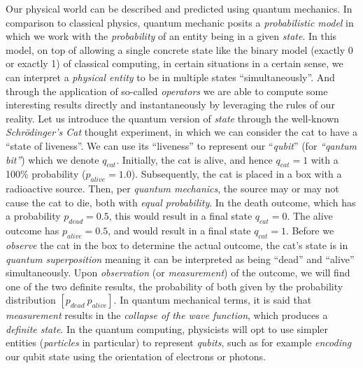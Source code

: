 \documentclass[conference]{IEEEtran}
\begin{document}
Our physical world can be described and predicted using quantum mechanics.
In comparison to classical physics, quantum mechanic posits a \textit{probabilistic model} in which we work with the \textit{probability} of an entity being in a given
\textit{state}.
In this model, on top of allowing a single concrete state like the binary model (exactly 0 or exactly 1) of classical computing,
in certain situations in a certain sense, we can interpret a \textit{physical entity}
to be in multiple states ``simultaneously''.
And through the application of so-called \textit{operators}
we are able to compute some interesting results directly and instantaneously by leveraging the rules of our reality.
Let us introduce the quantum version of \textit{state} through the well-known \textit{Schrödinger's Cat} thought experiment,
in which we can consider the cat to have a ``state of liveness''.
We can use its ``liveness'' to represent our ``\textit{qubit}'' (for \textit{``qantum bit''}) which we denote $q_{cat}$.
Initially, the cat is alive, and hence $q_{cat} = 1$ with
a 100\% probability ($p_{alive} = 1.0$).
Subsequently, the cat is placed in a box with a radioactive source. Then, per \textit{quantum mechanics},
the source may or may not cause the cat to die, both with \textit{equal probability}.
In the death outcome, which has a probability $p_{dead} = 0.5$, this would result in a final state $q_{cat} = 0$.
The alive outcome has $p_{alive} = 0.5$, and would result in a final state $q_{cat} = 1$.
Before we \textit{observe} the cat in the box to determine the actual outcome,
the cat's state is in \textit{quantum superposition} meaning it can be interpreted as being ``dead'' and ``alive'' simultaneously.
Upon \textit{observation} (or \textit{measurement}) of the outcome, we will find one of the two definite
results, the probability of both given by the probability distribution $\left[p_{dead}\ p_{alive}\right]$.
In quantum mechanical terms, it is said that \textit{measurement}
results in the \textit{collapse of the wave function}, which produces a \textit{definite state}.
In the quantum computing, physicists will opt to use simpler entities (\textit{particles} in particular) to represent \textit{qubits}, such as for
example \textit{encoding} our qubit state using the orientation of electrons or photons.
\end{document}
